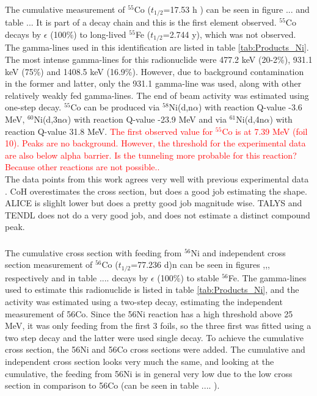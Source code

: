 \documentclass[a4paper,11pt,twoside]{book}
\begin{document}
\subsubsection{}
The cumulative measurement of $^{55}$Co ($t_{1/2}$=17.53 h \cite{Junde2008})  can be seen in figure ... and table ... It is part of a decay chain and this is the first element observed. $^{55}$Co decays by $\epsilon$ (100\%) to long-lived $^{55}$Fe ($t_{1/2}$=2.744 y), which was not observed. The gamma-lines used in this identification are listed in table \ref{tab:Products_Ni}. The most intense gamma-lines for this radionuclide were 477.2 keV (20-2\%), 931.1 keV (75\%) and 1408.5 keV (16.9\%). However, due to background contamination in the former and latter, only the 931.1 gamma-line was used, along with other relatively weakly fed gamma-lines. The end of beam activity was estimated using one-step decay. $^{55}$Co can be produced via $^{58}$Ni(d,n$\alpha$) with reaction Q-value -3.6 MeV, $^{60}$Ni(d,3n$\alpha$) with reaction Q-value -23.9 MeV and via $^{61}$Ni(d,4n$\alpha$) with reaction Q-value 31.8 MeV. \textcolor{red}{The first observed value for $^{55}$Co is at 7.39 MeV (foil 10). Peaks are no background. However, the threshold for the experimental data are also below alpha barrier. Is the tunneling more probable for this reaction? Because other reactions are not possible..}\\
\noindent 
The data points from this work agrees very well with previous experimental data \cite{Ochiai2007, Avrigeanu2016, Usman2016, Hermanne2013, Takacs2007, Takacs1997, Zweit1991, Amjed2013}. CoH overestimates the cross section, but does a good job estimating the shape. ALICE is slighlt lower but does a pretty good job magnitude wise. TALYS and TENDL does not do a very good job, and does not estimate a distinct compound peak. 


\subsubsection{}
The cumulative cross section with feeding from $^{56}$Ni and independent cross section measurement of $^{56}$Co ($t_{1/2}$=77.236 d)n\cite{Junde2011} can be seen in figures ,,, respectively and in table .... decays by $\epsilon$ (100\%) to stable $^{56}$Fe. The gamma-lines used to estimate this radionuclide is listed in table \ref{tab:Products_Ni}, and the activity was estimated using a two-step decay, estimating the independent measurement of 56Co. Since the 56Ni reaction has a high threshold above 25 MeV, it was only feeding from the first 3 foils, so the three first was fitted using a two step decay and the latter were used single decay. To achieve the cumulative cross section, the 56Ni and 56Co cross sections were added. The cumulative and independent cross section looks very much the same, and looking at the cumulative, the feeding from 56Ni is in general very low due to the low cross section in comparison to 56Co (can be seen in table .... ). 
\end{document}
